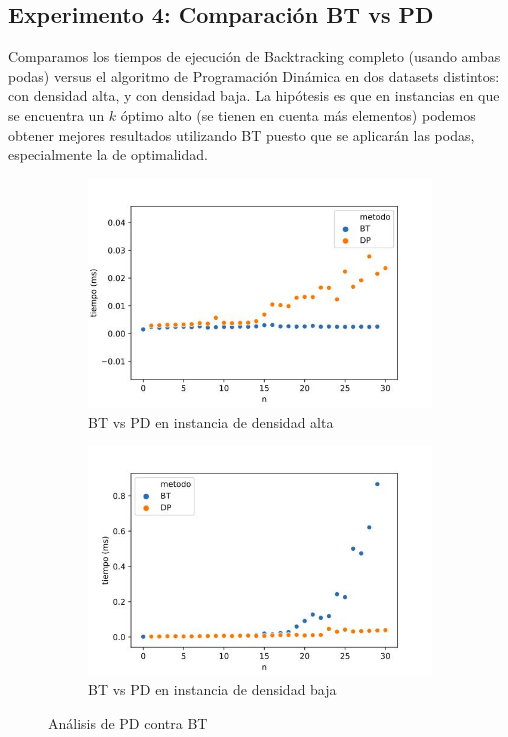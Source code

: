 \documentclass[10pt,a4paper]{article}
\begin{document}
\subsection{Experimento 4: Comparación BT vs PD}
Comparamos los tiempos de ejecución de Backtracking completo (usando ambas podas) versus el algoritmo de Programación Dinámica en dos datasets distintos: con densidad alta, y con densidad baja. La hipótesis es que en instancias en que se encuentra un $k$ óptimo alto (se tienen en cuenta más elementos) podemos obtener mejores resultados utilizando BT puesto que se aplicarán las podas, especialmente la de optimalidad.
\begin{figure}[h!]
	\centering
	\begin{subfigure}{0.4\linewidth}
		\centering
		\includegraphics[scale=0.3]{img/comparacion-bt-dp-alta.jpg}
		\caption{BT vs PD en instancia de densidad alta}
		\label{fig:comparacion-bt-dp-alta}
	\end{subfigure}
	\begin{subfigure}{0.4\linewidth}
		\centering
		\includegraphics[scale=0.3]{img/comparacion-bt-dp-baja.jpg}
		\caption{BT vs PD en instancia de densidad baja}
		\label{fig:comparacion-bt-dp-baja}
	\end{subfigure}
	\caption{Análisis de PD contra BT}
	\label{fig:bt-vs-pd}
\end{figure}
\end{document}
